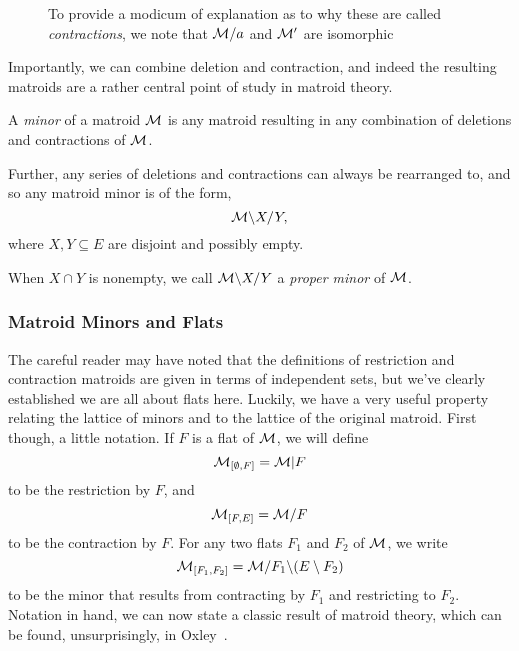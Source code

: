 \documentclass[12pt,oneside]{../../sfsuthesis}
\begin{document}
\begin{figure}[H]
\begin{subfigure}[t]{.45\textwidth}
    \end{subfigure}
    \caption{To provide a modicum of explanation as to why these are called \emph{contractions}, we note that \( \mathcal{M}/a \) and \( \mathcal{M}' \) are isomorphic}\label{fig:contractionMatroid}

\end{figure}

Importantly, we can combine deletion and contraction, and indeed the resulting matroids are a rather central point of study in matroid theory.

\begin{definition}\th\label{def:minor}
    A \emph{minor} of a matroid \( \mathcal{M} \) is any matroid resulting in any combination of deletions and contractions of \( \mathcal{M} \).

    Further, any series of deletions and contractions can always be rearranged to, and so any matroid minor is of the form,
    \[
        \mathcal{M} \backslash X / Y,
    \]
    where \( X, Y \subseteq E \) are disjoint and possibly empty.

    When \( X \cap Y \) is nonempty, we call \( \mathcal{M} \backslash X / Y \) a \emph{proper minor} of \( \mathcal{M} \).
\end{definition}

\subsubsection{Matroid Minors and Flats}

The careful reader may have noted that the definitions of restriction and contraction matroids are given in terms of independent sets, but we've clearly established we are all about flats here.
Luckily, we have a very useful property relating the lattice of minors and to the lattice of the original matroid.
First though, a little notation.
If \( F \) is a flat of \( \mathcal{M} \), we will define
\[
    \mathcal{M}_{[\emptyset, F]} = \mathcal{M}|F
\]
to be the restriction by \( F \), and
\[
    \mathcal{M}_{[F, E]} = \mathcal{M}  / F
\]
to be the contraction by \( F \).
For any two flats \( F_1 \) and \( F_2 \) of \( \mathcal{M} \), we write
\[
    \mathcal{M}_{[F_1, F_2]} = \mathcal{M} / F_1 \backslash (E \setminus F_2)
\]
to be the minor that results from contracting by \( F_1 \) and restricting to \( F_2 \).
Notation in hand, we can now state a classic result of matroid theory, which can be found, unsurprisingly, in Oxley~\cite[p.~116]{oxleyMatroidTheory2011}.
\end{document}
